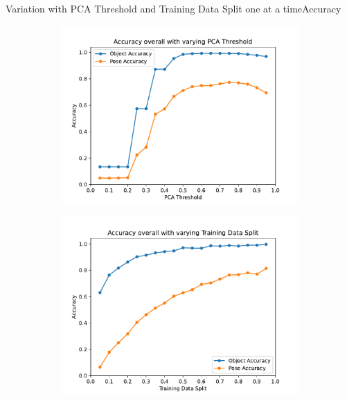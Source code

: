 \documentclass[aspectratio=169, handout, 10pt, hyperref=colorlinks]{beamer}
\begin{document}
\begin{frame}{Variation with PCA Threshold and Training Data Split one at a time}{Accuracy}
    \begin{figure}
        \centering
        \begin{subfigure}{0.48\linewidth}
            \centering
            \includegraphics[width=\linewidth]{pca/accuracy_overall.pdf}
        \end{subfigure}
        \begin{subfigure}{0.48\linewidth}
            \centering
            \includegraphics[width=\linewidth]{tds/accuracy_overall.pdf}
        \end{subfigure}
    \end{figure}
\end{frame}
\end{document}
